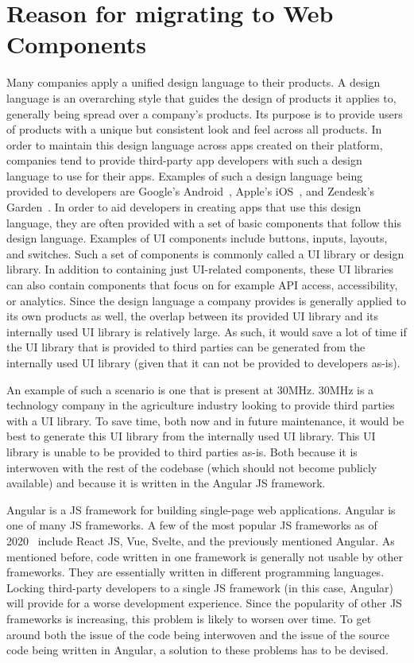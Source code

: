 \section{Reason for migrating to Web Components}
Many companies apply a unified design language to their products. A design language is an overarching style that guides the design of products it applies to, generally being spread over a company's products. Its purpose is to provide users of products with a unique but consistent look and feel across all products. In order to maintain this design language across apps created on their platform, companies tend to provide third-party app developers with such a design language to use for their apps. Examples of such a design language being provided to developers are Google's Android~, Apple's iOS~, and Zendesk's Garden~. In order to aid developers in creating apps that use this design language, they are often provided with a set of basic components that follow this design language. Examples of UI components include buttons, inputs, layouts, and switches. Such a set of components is commonly called a UI library or design library. In addition to containing just UI-related components, these UI libraries can also contain components that focus on for example API access, accessibility, or analytics. Since the design language a company provides is generally applied to its own products as well, the overlap between its provided UI library and its internally used UI library is relatively large. As such, it would save a lot of time if the UI library that is provided to third parties can be generated from the internally used UI library (given that it can not be provided to developers as-is).

An example of such a scenario is one that is present at 30MHz. 30MHz is a technology company in the agriculture industry looking to provide third parties with a UI library. To save time, both now and in future maintenance, it would be best to generate this UI library from the internally used UI library. This UI library is unable to be provided to third parties as-is. Both because it is interwoven with the rest of the codebase (which should not become publicly available) and because it is written in the Angular JS framework.

Angular is a JS framework for building single-page web applications. Angular is one of many JS frameworks. A few of the most popular JS frameworks as of 2020~ include React JS, Vue, Svelte, and the previously mentioned Angular. As mentioned before, code written in one framework is generally not usable by other frameworks. They are essentially written in different programming languages. Locking third-party developers to a single JS framework (in this case, Angular) will provide for a worse development experience. Since the popularity of other JS frameworks is increasing, this problem is likely to worsen over time. To get around both the issue of the code being interwoven and the issue of the source code being written in Angular, a solution to these problems has to be devised.

